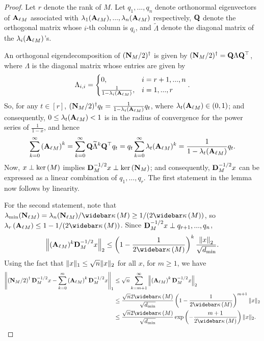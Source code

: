 \begin{proof} Let $r$ denote the rank of $M$. Let $q_1, ..., q_{n}$ denote orthonormal eigenvectors of ${\mathbf{A}_\ell}_{M}$ associated with $\lambda_1({\mathbf{A}_\ell}_{M}), ..., \lambda_{n}({\mathbf{A}_\ell}_{M})$ respectively, $\mathbf{Q}$ denote the orthogonal matrix whose $i$-th column is $q_i$, and $\widetilde{\Lambda}$ denote the diagonal matrix of the $\lambda_i({\mathbf{A}_\ell}_{M})$'s. 

An orthogonal eigendecomposition of ${(\mathbf{N}_{M}}/2)^\dagger$ is given by  $(\mathbf{N}_{M}/2)^\dagger = \mathbf{Q} \Lambda \mathbf{Q}^\top$, where $\Lambda$ is the diagonal matrix whose entries are given by 
\begin{align*}
    \Lambda_{i,i} = \begin{cases}
        0, & i = r+1, ..., n \\
        \frac{1}{1-\lambda_i({\mathbf{A}_\ell}_{M})}, & i = 1, ..., r
    \end{cases}. 
\end{align*}
So, for any $t \in [r]$, ${(\mathbf{N}_{M}/2})^\dagger q_t = \frac{1}{1-\lambda_t({\mathbf{A}_\ell}_{M})} q_t$, where $\lambda_t({\mathbf{A}_\ell}_{M}) \in (0, 1)$; and consequently, $0 \leq \lambda_t({\mathbf{A}_\ell}_{M}) < 1$ is in the radius of convergence for the power series of $\frac{1}{1-x}$, and hence 
\begin{align*}
    \sum_{k=0}^\infty \left({\mathbf{A}_\ell}_{M}\right)^k = \sum_{k=0}^\infty \mathbf{Q} \widetilde{\Lambda}^k \mathbf{Q}^\top q_t = q_t \sum_{k=0}^\infty \lambda_{t}({\mathbf{A}_\ell}_{M})^k = \frac{1}{1-\lambda_t({\mathbf{A}_\ell}_{M})} q_t. 
\end{align*}
Now, $x \perp \mathrm{ker}\left(M\right)$ implies ${\mathbf{D}}_{M}^{-1/2}x \perp \mathrm{ker}\left(\mathbf{N}_{M}\right)$; and consequently, ${\mathbf{D}}_{M}^{-1/2}x$ can be expressed as a linear combination of $q_1, ..., q_r$. The first statement in the lemma now follows by linearity. 

For the second statement, note that $\lambdamin(\normalizedlazy{M}) = \lambda_n(\normalizedlazy{M})/\pcondOf{M} \geq {1}/{(2\pcondOf{M})}$, so $\lambda_{r}\left( \adjacencylazy{M} \right) \leq 1 - {1}/{(2 \pcondOf{M})}$. Since ${\mathbf{D}}_{M}^{-1/2}x \perp q_{r+1}, ..., q_{n}$,
\begin{align*}
    \left\Vert (\adjacencylazy{M})^k \diagonal{M}^{-1/2}x \right\Vert_2 \leq \left(1 - \frac{1}{2\pcondOf{M}} \right)^k \frac{\normFull{x}_2}{\sqrt{\dmin}}. 
\end{align*}
Using the fact that $\|x\|_1 \leq \sqrt{n}\|x\|_2$ for all $x$, for $m \geq 1$, we have
\begin{align*}
    \left\Vert \left(\normalized{M}/2\right)^\dagger \diagonal{M}^{-1/2}x - \sum_{k=0}^{m} \left( \adjacencylazy{M} \right)^k  \diagonal{M}^{-1/2}x \right\Vert_1
    &\leq \sqrt{n} \sum_{k=m+1}^{\infty} \left\Vert \left( \adjacencylazy{M} \right)^k  \diagonal{M}^{-1/2}x \right\Vert_2 \\
    &\leq \frac{\sqrt{n} 2\pcondOf{M}}{\sqrt{\dmin}} \left(1 - \frac{1}{2\pcondOf{M}} \right)^{m+1} \norm{x}_2 \\
    &\leq \frac{\sqrt{n} 2\pcondOf{M}}{\sqrt{\dmin}} \exp\left(- \frac{m+1}{2\pcondOf{M}}\right) \norm{x}_2.
\end{align*}
\end{proof}

